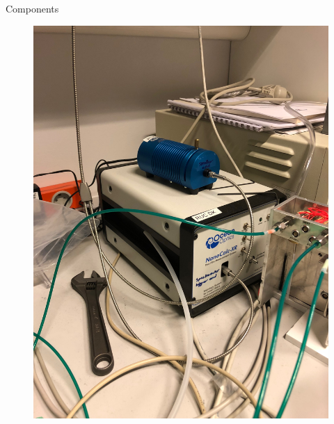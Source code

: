\documentclass[10pt]{beamer}
\begin{document}
\begin{frame}{Components}
\begin{minipage}{0.5\textwidth}
\begin{figure}
		\includegraphics[scale=0.04,angle=-90]{setup2.JPG}
		\end{figure}
		\end{minipage}
	
		\end{frame}
		
\end{document}

